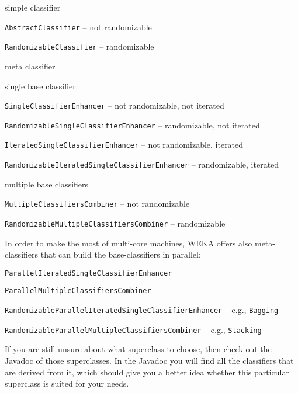 \begin{tight_itemize}
  \item simple classifier
	\begin{tight_itemize}
	  \item \texttt{AbstractClassifier} -- not randomizable
	  \item \texttt{RandomizableClassifier} -- randomizable
	\end{tight_itemize}
  \item meta classifier
	\begin{tight_itemize}
	  \item single base classifier
		\begin{tight_itemize}
		  \item \texttt{SingleClassifierEnhancer} -- not randomizable, not
iterated
		  \item \texttt{RandomizableSingleClassifierEnhancer} -- randomizable,
not iterated
		  \item \texttt{IteratedSingleClassifierEnhancer} -- not randomizable,
iterated
		  \item \texttt{RandomizableIteratedSingleClassifierEnhancer} --
randomizable, iterated
		\end{tight_itemize}
	  \item multiple base classifiers
		\begin{tight_itemize}
		  \item \texttt{MultipleClassifiersCombiner} -- not randomizable
		  \item \texttt{RandomizableMultipleClassifiersCombiner} -- randomizable
		\end{tight_itemize}
	\end{tight_itemize}
\end{tight_itemize}
In order to make the most of multi-core machines, WEKA offers also
meta-classifiers that can build the base-classifiers in parallel:
\begin{tight_itemize}
  \item \texttt{ParallelIteratedSingleClassifierEnhancer}
  \item \texttt{ParallelMultipleClassifiersCombiner}
  \item \texttt{RandomizableParallelIteratedSingleClassifierEnhancer} -- e.g.,
\texttt{Bagging}
  \item \texttt{RandomizableParallelMultipleClassifiersCombiner} -- e.g.,
\texttt{Stacking}
\end{tight_itemize}
If you are still unsure about what superclass to choose, then check out the
Javadoc of those superclasses. In the Javadoc you will find all the classifiers
that are derived from it, which should give you a better idea whether this
particular superclass is suited for your needs.

